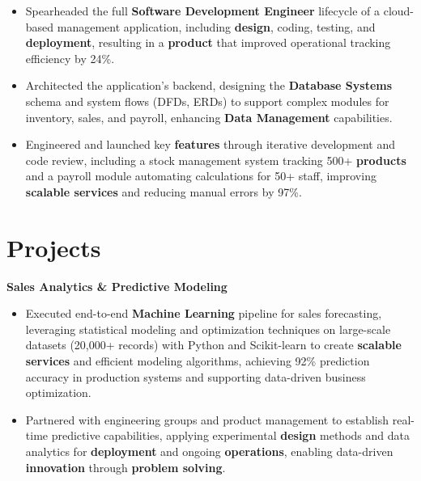 \documentclass[a4paper,10pt]{article}
\begin{document}
\begin{itemize}[leftmargin=*, itemsep=0pt, parsep=1pt] %
\vspace{-7mm}
    \item Spearheaded the full \textbf{Software Development Engineer} lifecycle of a cloud-based management application, including \textbf{design}, coding, testing, and \textbf{deployment}, resulting in a \textbf{product} that improved operational tracking efficiency by 24\%.
\item Architected the application's backend, designing the \textbf{Database Systems} schema and system flows (DFDs, ERDs) to support complex modules for inventory, sales, and payroll, enhancing \textbf{Data Management} capabilities.
\item Engineered and launched key \textbf{features} through iterative development and code review, including a stock management system tracking 500+ \textbf{products} and a payroll module automating calculations for 50+ staff, improving \textbf{scalable services} and reducing manual errors by 97\%. 

\end{itemize}

\vspace{-4mm}

\section*{Projects}
\textbf{Sales Analytics \& Predictive Modeling} \\
\begin{itemize}[leftmargin=*, itemsep=0pt, parsep=1pt]
\vspace{-7mm}
    \item Executed end-to-end \textbf{Machine Learning} pipeline for sales forecasting, leveraging statistical modeling and optimization techniques on large-scale datasets (20,000+ records) with Python and Scikit-learn to create \textbf{scalable services} and efficient modeling algorithms, achieving 92\% prediction accuracy in production systems and supporting data-driven business optimization.
    \item Partnered with engineering groups and product management to establish real-time predictive capabilities, applying experimental \textbf{design} methods and data analytics for \textbf{deployment} and ongoing \textbf{operations}, enabling data-driven \textbf{innovation} through \textbf{problem solving}.
    \end{itemize}
\end{document}
